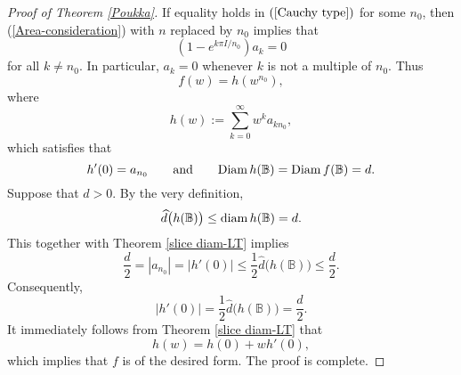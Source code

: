 \documentclass{amsart}
\theoremstyle{definition}
\theoremstyle{remark}
\numberwithin{equation}{section}
\begin{document}
\begin{proof}[Proof of Theorem \ref{Poukka}]
If equality holds in $(\ref{Cauchy type})$ for some $n_0$, then (\ref{Area-consideration}) with $n$ replaced by $n_0$ implies that
$$(1-e^{k\pi I/n_0})a_k=0$$
for all $k\neq n_0$. In particular, $a_k=0$ whenever $k$ is not a multiple of $n_0$. Thus
\begin{equation}\label{fh-relation}
f(w)=h(w^{n_0}),
\end{equation}
where
$$h(w):=\sum_{k=0}^{\infty}w^ka_{kn_0},$$
which satisfies that
\begin{equation}\label{h-definition00}
h'(0)=a_{n_0}\qquad \mbox{and} \qquad {\rm{Diam}}\, h(\mathbb B)={\rm{Diam}}\, f(\mathbb B)=d.
\end{equation}
Suppose that $d>0$. By the very definition,
$$\widehat{d}\big(h(\mathbb B)\big)\leq {\rm{diam}}\,h(\mathbb B)=d. $$
This together with Theorem \ref{slice diam-LT} implies
$$\frac{d}2=|a_{n_0}|=|h'(0)|\leq\frac12 \widehat{d}\big(h(\mathbb B)\big)\leq \frac{d}2.$$
Consequently,
$$ |h'(0)|=\frac12 \widehat{d}\big(h(\mathbb B)\big)=\frac{d}2.$$
It immediately follows from Theorem \ref{slice diam-LT} that
$$h(w)=h(0)+wh'(0),$$
which implies that $f$ is of the desired form. The proof is complete.
\end{proof}
\end{document}
